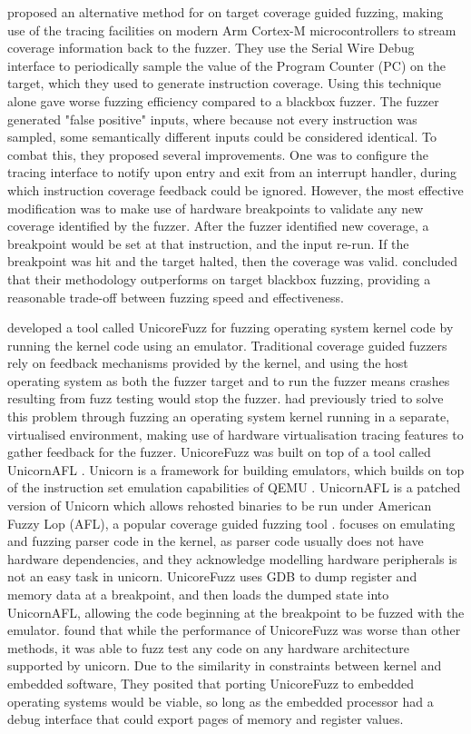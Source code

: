 \documentclass[../report.tex]{subfiles}
\begin{document}
\citet{Beckmann_2023} proposed an alternative method for on target coverage
guided fuzzing, making use of the tracing facilities on modern Arm Cortex-M
microcontrollers to stream coverage information back to the fuzzer. They use
the Serial Wire Debug interface to periodically sample the value of the Program
Counter (PC) on the target, which they used to generate instruction coverage.
Using this technique alone gave worse fuzzing efficiency compared to a blackbox
fuzzer. The fuzzer generated "false positive" inputs, where because not every
instruction was sampled, some semantically different inputs could be
considered identical. To combat this, they proposed several improvements. One
was to configure the tracing interface to notify upon entry and exit from an
interrupt handler, during which instruction coverage feedback could be ignored.
However, the most effective modification was to make use of hardware
breakpoints to validate any new coverage identified by the fuzzer. After the
fuzzer identified new coverage, a breakpoint would be set at that instruction,
and the input re-run. If the breakpoint was hit and the target halted, then the
coverage was valid. \citet{Beckmann_2023} concluded that their methodology
outperforms on target blackbox fuzzing, providing a reasonable trade-off
between fuzzing speed and effectiveness.

\citet{Maier_2019} developed a tool called UnicoreFuzz for fuzzing operating
system kernel code by running the kernel code using an emulator. Traditional
coverage guided fuzzers rely on feedback mechanisms provided by the kernel, and
using the host operating system as both the fuzzer target and to run the fuzzer
means crashes resulting from fuzz testing would stop the fuzzer.
\citet{kAFL_2017} had previously tried to solve this problem through fuzzing an
operating system kernel running in a separate, virtualised environment, making
use of hardware virtualisation tracing features to gather feedback for the
fuzzer. UnicoreFuzz was built on top of a tool called UnicornAFL
\citep{Maier_2019}. Unicorn is a framework for building emulators, which builds
on top of the instruction set emulation capabilities of QEMU \citep{Unicorn}.
UnicornAFL is a patched version of Unicorn which allows rehosted binaries to be
run under American Fuzzy Lop (AFL), a popular coverage guided fuzzing tool
\citep{UnicornMode, AFL_2019}.
\citet{Maier_2019} focuses on emulating and fuzzing parser code in the kernel,
as parser code usually does not have hardware dependencies, and they
acknowledge modelling hardware peripherals is not an easy task in unicorn.
UnicoreFuzz uses GDB to dump register and memory data at a breakpoint, and then
loads the dumped state into UnicornAFL, allowing the code beginning at the
breakpoint to be fuzzed with the emulator. \citet{Maier_2019} found that while
the performance of UnicoreFuzz was worse than other methods, it was able to
fuzz test any code on any hardware architecture supported by unicorn. Due to
the similarity in constraints between kernel and embedded software, They
posited that porting UnicoreFuzz to embedded operating systems would be viable,
so long as the embedded processor had a debug interface that could export pages
of memory and register values.
\end{document}
